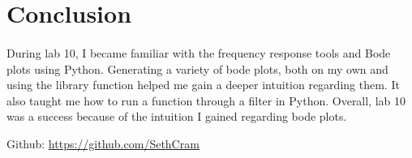 \documentclass[12pt]{report}
\begin{document}
\section{Conclusion}


    \paragraph{} During lab 10, I became familiar with the frequency response tools and Bode plots using Python. Generating a variety of bode plots, both on my own and using the library function helped me gain a deeper intuition regarding them. It also taught me how to run a function through a filter in Python. Overall, lab 10 was a success because of the intuition I gained regarding bode plots.  
    
    Github: \url{https://github.com/SethCram} 

\newpage
\end{document}
